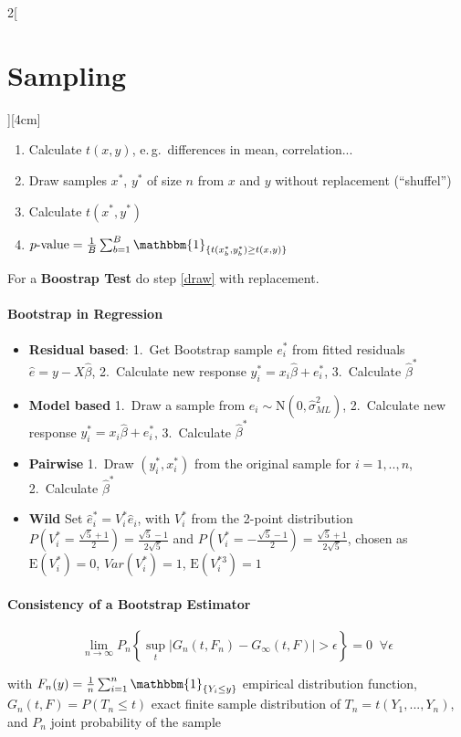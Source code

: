 \documentclass[8pt]{extarticle}
\begin{document}
\begin{multicols}{2}[\section{Sampling}][4cm]
\begin{enumerate}
\item Calculate $t(x,y)$, e.\,g.\ differences in mean, correlation...
\item Draw samples $x^*$, $y^*$ of size $n$ from $x$ and $y$ without replacement (``shuffel'')\label{draw}
\item Calculate $t(x^*, y^*)$ 
\item $p\text{-value} = \frac{1}{B}\sum_{b=1}^B \mathbbm{1}_{\{t(x_b^*,y_b^*)\geq t(x,y)\}}$
\end{enumerate}

For a \textbf{Boostrap Test} do step \ref{draw} with replacement.

\paragraph{Bootstrap in \textbf{Regression}}
\begin{itemize}
\item \textbf{Residual based}: 1.~Get Bootstrap sample $e_i^*$ from fitted residuals $\hat{e} = y- X\hat{\beta}$, 2.~Calculate new response $y_i^* = x_i\hat{\beta} + e_i^*$, 3.~Calculate $\hat{\beta}^*$
\item \textbf{Model based} 1.~Draw a sample from $e_i \sim \mathrm{N}(0, \hat{\sigma}_{ML}^2)$, 2.~Calculate new response $y_i^* = x_i\hat{\beta} + e_i^*$, 3.~Calculate $\hat{\beta}^*$
\item \textbf{Pairwise} 1.~Draw $(y_i^*, x_i^*)$ from the original sample for $i=1,..,n$, 2.~Calculate $\hat{\beta}^*$
\item \textbf{Wild} Set $\hat{e}_i^* = V_i^*\hat{e}_i$, with $V_i^*$ from the 2-point distribution $P(V_i^* {=}\frac{\sqrt{5}{+}1}{2})=\frac{\sqrt{5}{-}1}{2\sqrt{5}}$ and $P(V_i^* {=}{-}\frac{\sqrt{5}{-}1}{2})=\frac{\sqrt{5}{+}1}{2\sqrt{5}}$, chosen as $\mathrm{E}(V_i^*)=0$, $Var(V_i^*)=1$, $\mathrm{E}(V_i^{*3})=1$
\end{itemize}

\paragraph{Consistency of a Bootstrap Estimator} 

$$ \underset{n\rightarrow\infty}{\lim} P_n\left\{\underset{t}{\sup}\left|G_n(t,F_n)-G_\infty(t,F)\right|>\epsilon\right\} = 0  \;\; \forall \epsilon $$

\noindent with $F_n(y) = \frac{1}{n}\sum_{i=1}^n \mathbbm{1}_{\{Y_i\leq y\}}$ empirical distribution function, $G_n(t, F) = P(T_n\leq t)$ exact finite sample distribution of $T_n = t(Y_1,...,Y_n)$, and $P_n$ joint probability of the sample


\end{multicols}
\end{document}
